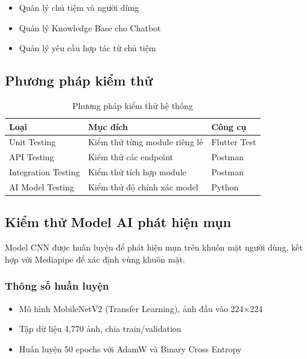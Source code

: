 \begin{itemize}
    \item Quản lý chủ tiệm và người dùng
    \item Quản lý Knowledge Base cho Chatbot
    \item Quản lý yêu cầu hợp tác từ chủ tiệm
\end{itemize}

\subsection{Phương pháp kiểm thử}

\begin{table}[H]
\centering
\caption{Phương pháp kiểm thử hệ thống}
\begin{tabular}{|l|p{}|l|}
\hline
\textbf{Loại} & \textbf{Mục đích} & \textbf{Công cụ} \\
\hline
Unit Testing & Kiểm thử từng module riêng lẻ & Flutter Test \\
\hline
API Testing & Kiểm thử các endpoint & Postman \\
\hline
Integration Testing & Kiểm thử tích hợp module & Postman \\
\hline
AI Model Testing & Kiểm thử độ chính xác model & Python \\
\hline
\end{tabular}
\end{table}

\subsection{Kiểm thử Model AI phát hiện mụn}

Model CNN được huấn luyện để phát hiện mụn trên khuôn mặt người dùng, kết hợp với Mediapipe để xác định vùng khuôn mặt.

\subsubsection{Thông số huấn luyện}

\begin{itemize}
    \item Mô hình MobileNetV2 (Transfer Learning), ảnh đầu vào 224×224
    \item Tập dữ liệu 4,770 ảnh, chia train/validation
    \item Huấn luyện 50 epochs với AdamW và Binary Cross Entropy
\end{itemize}

